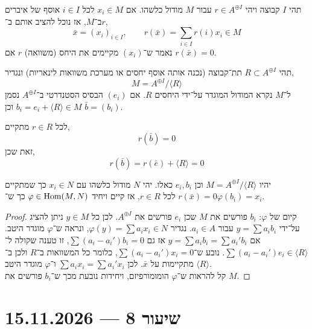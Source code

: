 \begin{definition}
	תהי $I$ קבוצה ויהי $r \in A^{\oplus I}$ עבור $M$ מודול כלשהו.
	אם $x_i \in M$ לכל $i \in I$ אוסף של איברים ב־$M$, אז נוכל להציב אותם ב־$r$,
	\[
		\bar{x} = {( x_i )}_{i \in I},
		\qquad
		r(\bar{x})
		= \sum_{i \in I} r(i) x_i
		\in M
	\]
	נאמר ש־$( x_i )$ מקיימים את היחס (משוואה) $r$ אם $r(\bar{x}) = 0$.

	תהי $R \subset A^{\oplus I}$ תת־קבוצה (נכנה אותה אוסף יחסים או מערכת משוואות לינאריות) ונגדיר,
	\[
		M
		= A^{\oplus I} / \langle R \rangle
	\]
	ל־$M$ נקרא המודול המוגדר על־ידי היחסים $R$.
	אם $( e_i )$ הבסיס הסטנדרטי ב־$A^{\oplus I}$ נסמן $b_i = e_i + \langle R \rangle \in M$ וכן $\bar{b} = ( b_i )$.
\end{definition}
לכל $r \in R$ מתקיים,
\[
	r(\bar{b}) = 0
\]
זאת שכן,
\[
	r(\bar{b})
	= r(\bar{e}) + \langle R \rangle
	= 0
\]
\begin{theorem}
	יהיו $M = A^{\oplus I} / \langle R \rangle$ וכן $e_i, b_i$ כאלו.
	יהי $N$ מודול כלשהו עם $x_i \in N$ כך שמתקיים $r(\bar{x}) = 0$ לכל $r \in R$, אז קיים ויחיד $\varphi \in \operatorname{Hom}(M, N)$ כך ש־$\varphi(b_i) = x_i$.
\end{theorem}
\begin{proof}
	קיום של $\varphi$:
	$b_i$ פורשים את $M$ שכן $e_i$ פורשים את $A^{\oplus I}$.
	לכן כל $y \in M$ ניתן להציג על־ידי $y = \sum a_i b_i$ עבור $a_i \in A$.
	נגדיר $\varphi(y) = \sum a_i x_i \in N$, ונראה ש־$\varphi$ מוגדר היטב.
	אם $y = \sum a_i b_i = \sum a_i' b_i$ אז גם $\sum (a_i - a_i') b_i = 0$, זו טענה שקולה ל־$\sum (a_i - a_i') e_i \in \langle R \rangle$.
	נובע ש־$\sum (a_i - a_i') x_i = 0$, כלומר כל המשוואות ב־$R$ ולכן ב־$\langle R \rangle$ מתקיימות על $\bar{x}$.
	לכן $\sum a_i x_i = \sum a_i' x_i$ ו־$\varphi$ מוגדר היטב. \\
	קל להראות ש־$\varphi$ הומומורפיזם, ויחידות נובעת מכך ש־$b_i$ פורשים את $M$.
\end{proof}

\section{שיעור 8 --- 15.11.2026}
